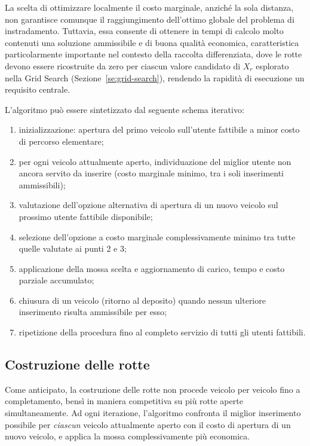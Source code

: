La scelta di ottimizzare localmente il costo marginale, anziché la sola distanza, non garantisce comunque il raggiungimento dell'ottimo globale del problema di instradamento. Tuttavia, essa consente di ottenere in tempi di calcolo molto contenuti una soluzione ammissibile e di buona qualità economica, caratteristica particolarmente importante nel contesto della raccolta differenziata, dove le rotte devono essere ricostruite da zero per ciascun valore candidato di $X_r$ esplorato nella Grid Search (Sezione~\ref{se:grid-search}), rendendo la rapidità di esecuzione un requisito centrale.

L'algoritmo può essere sintetizzato dal seguente schema iterativo:

\begin{enumerate}
	\item inizializzazione: apertura del primo veicolo sull'utente fattibile a minor costo di percorso elementare;
	\item per ogni veicolo attualmente aperto, individuazione del miglior utente non ancora servito da inserire (costo marginale minimo, tra i soli inserimenti ammissibili);
	\item valutazione dell'opzione alternativa di apertura di un nuovo veicolo sul prossimo utente fattibile disponibile;
	\item selezione dell'opzione a costo marginale complessivamente minimo tra tutte quelle valutate ai punti 2 e 3;
	\item applicazione della mossa scelta e aggiornamento di carico, tempo e costo parziale accumulato;
	\item chiusura di un veicolo (ritorno al deposito) quando nessun ulteriore inserimento risulta ammissibile per esso;
	\item ripetizione della procedura fino al completo servizio di tutti gli utenti fattibili.
\end{enumerate}

\subsection{Costruzione delle rotte}

Come anticipato, la costruzione delle rotte non procede veicolo per veicolo fino a completamento, bensì in maniera competitiva su più rotte aperte simultaneamente. Ad ogni iterazione, l'algoritmo confronta il miglior inserimento possibile per \emph{ciascun} veicolo attualmente aperto con il costo di apertura di un nuovo veicolo, e applica la mossa complessivamente più economica.

